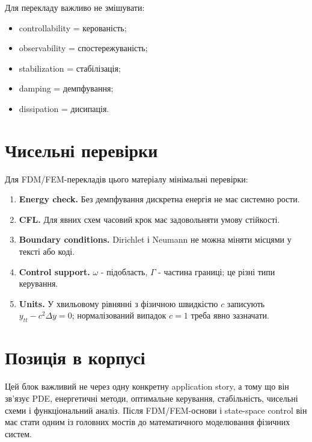 Для перекладу важливо не змішувати:
\begin{itemize}
\item controllability = керованість;
\item observability = спостережуваність;
\item stabilization = стабілізація;
\item damping = демпфування;
\item dissipation = дисипація.
\end{itemize}

\section{Чисельні перевірки}

Для FDM/FEM-перекладів цього матеріалу мінімальні перевірки:
\begin{enumerate}[label=\arabic*.]
\item \textbf{Energy check.} Без демпфування дискретна енергія не має системно рости.
\item \textbf{CFL.} Для явних схем часовий крок має задовольняти умову стійкості.
\item \textbf{Boundary conditions.} Dirichlet і Neumann не можна міняти місцями у тексті або коді.
\item \textbf{Control support.} $\omega$ - підобласть, $\Gamma$ - частина границі; це різні типи керування.
\item \textbf{Units.} У хвильовому рівнянні з фізичною швидкістю $c$ записують $y_{tt}-c^2\Delta y=0$; нормалізований випадок $c=1$ треба явно зазначати.
\end{enumerate}

\section{Позиція в корпусі}

Цей блок важливий не через одну конкретну application story, а тому що він зв'язує PDE, енергетичні методи, оптимальне керування, стабільність, чисельні схеми і функціональний аналіз. Після FDM/FEM-основи і state-space control він має стати одним із головних мостів до математичного моделювання фізичних систем.
